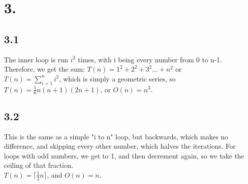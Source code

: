 \documentclass[12pt]{article}
\begin{document}
\section*{3.}
\subsection*{3.1}
The inner loop is run \(i^2\) times, with i being every number from 0 to n-1. Therefore, we get the sum:
\(T(n)=1^2+2^2+3^2\dots+n^2\) or\\
\(T(n)=\displaystyle\sum_{i=1}^n i^2\), which is simply a geometric series, so \(T(n)=\frac{1}{6}n(n+1)(2n+1)\), or \(O(n)=n^3\).
\subsection*{3.2}
This is the same as a simple "i to n" loop, but backwards, which makes no difference, and skipping every other number, which halves the iterations. For loops with odd numbers, we get to 1, and then decrement again, so we take the ceiling of that fraction.\\
\(T(n)=\lceil\frac{1}{2}n\rceil\), and \(O(n)=n\).
\end{document}
